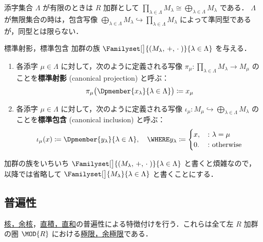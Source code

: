 \documentclass[geometry_main]{subfiles}
\begin{document}
\begin{marker}
	添字集合 $\Lambda$ が有限のときは $R$ 加群として $\displaystyle\prod_{\lambda \in \Lambda} M_\lambda \cong \bigoplus_{\lambda \in \Lambda} M_\lambda$ である．
	$\Lambda$ が無限集合の時は，包含写像 $\displaystyle\bigoplus_{\lambda \in \Lambda} M_\lambda \hookrightarrow \prod_{\lambda \in \Lambda} M_\lambda$ によって準同型であるが，同型とは限らない．
\end{marker}

\begin{mydef}[label=def:inj-proj]{標準射影，標準包含}
	加群の族 $\Familyset[\big]{(M_\lambda,\, +,\, \cdot\mathrel{})}{\lambda \in \Lambda}$ を与える．
	\begin{enumerate}
		\item 各添字 $\mu \in \Lambda$ に対して，次のように定義される写像 $\pi_\mu \colon \displaystyle\prod_{\lambda \in \Lambda} M_\lambda \to M_\mu$ のことを\textbf{標準射影} (canonical projection) と呼ぶ：
		\begin{align}
			\pi_\mu \bigl( \Dpmember{x_\lambda}{\lambda \in \Lambda} \bigr) \coloneqq x_\mu
		\end{align}
		\item 各添字 $\mu \in \Lambda$ に対して，次のように定義される写像 $\iota_\mu \colon M_\mu \hookrightarrow \displaystyle\bigoplus_{\lambda \in \Lambda} M_\lambda$ のことを\textbf{標準包含} (canonical inclusion) と呼ぶ：
		\begin{align}
			\iota_\mu (x) \coloneqq \Dpmember{y_\lambda}{\lambda \in \Lambda},\quad 
			\WHERE y_\lambda \coloneqq 
			\begin{cases}
				x, &\colon \lambda = \mu \\
				0. &\colon \mathrm{otherwise}
			\end{cases}
		\end{align}
	\end{enumerate}
\end{mydef}

加群の族をいちいち $\Familyset[\big]{(M_\lambda,\, +,\, \cdot\mathrel{})}{\lambda \in \Lambda}$ と書くと煩雑なので，以降では省略して $\Familyset[\big]{M_\lambda}{\lambda\in\Lambda}$ と書くことにする．

\subsection{普遍性}

\hyperref[def:ker-module]{核，余核}，\hyperref[def:dp-mod]{直積，直和}の普遍性による特徴付けを行う．これらは全て左 $R$ 加群の圏 $\MOD{R}$ における\hyperref[def:limit]{極限，余極限}である．
\end{document}
